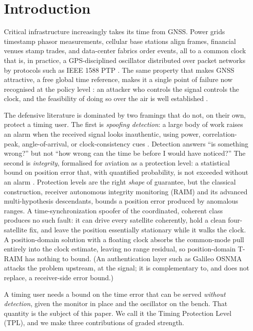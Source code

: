 \documentclass[conference]{IEEEtran}
\begin{document}
\section{Introduction}
Critical infrastructure increasingly takes its time from GNSS. Power grids
timestamp phasor measurements, cellular base stations align frames, financial
venues stamp trades, and data-center fabrics order events, all to a common clock
that is, in practice, a GPS-disciplined oscillator distributed over packet
networks by protocols such as IEEE 1588 PTP \cite{volpe,g8272,c37118,ptp}. The
same property that makes GNSS attractive, a free global time reference, makes it a
single point of failure now recognised at the policy level \cite{eo13905}: an
attacker who controls the signal controls the clock, and the feasibility of doing
so over the air is well established \cite{humphreys,tippenhauer}.

The defensive literature is dominated by two framings that do not, on their own,
protect a timing user. The first is \emph{spoofing detection}: a large body of
work raises an alarm when the received signal looks inauthentic, using power,
correlation-peak, angle-of-arrival, or clock-consistency cues
\cite{psiaki,humphreys,akos,dovis,jafarnia,schmidt}. Detection answers ``is
something wrong?'' but not ``how wrong can the time be before I would have
noticed?'' The second is
\emph{integrity}, formalised for aviation as a protection level: a statistical
bound on position error that, with quantified probability, is not exceeded
without an alarm \cite{brown,walter,blanch}. Protection levels are the right
\emph{shape} of guarantee, but the classical construction, receiver autonomous
integrity monitoring (RAIM) and its advanced multi-hypothesis descendants, bounds
a position error produced by anomalous ranges. A time-synchronization spoofer of
the coordinated, coherent class \cite{psiaki,tippenhauer} produces no such fault:
it can drive every satellite coherently, hold a clean four-satellite fix, and
leave the position essentially stationary while it walks the clock. A
position-domain solution with a floating clock absorbs the common-mode pull
entirely into the clock estimate, leaving no range residual, so position-domain
T-RAIM has nothing to bound. (An authentication layer such as Galileo OSNMA
\cite{osnma} attacks the problem upstream, at the signal; it is complementary to,
and does not replace, a receiver-side error bound.)

A timing user needs a bound on the time error that can be served
\emph{without detection}, given the monitor in place and the oscillator on the
bench. That quantity is the subject of this paper. We call it the Timing
Protection Level (TPL), and we make three contributions of graded strength.
\end{document}
